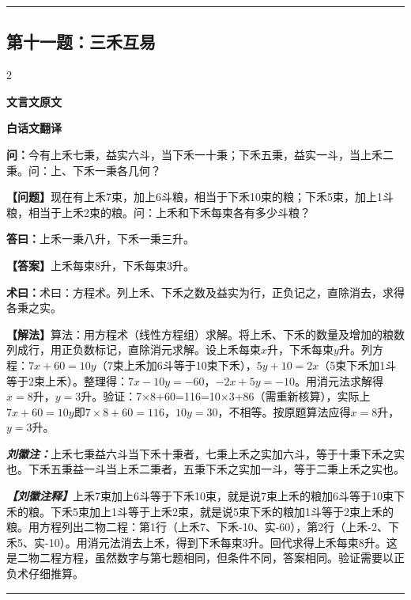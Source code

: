\documentclass[10pt,a4paper]{article}
\newcommand{\wen}[1]{\textbf{\color{problemcolor}问：}#1\par}
\newcommand{\da}[1]{\textbf{答曰：}#1\par}
\newcommand{\shu}[1]{\textbf{术曰：}#1\par}
\newcommand{\liuhui}[1]{{\color{commentarycolor}\textit{\textbf{刘徽注：}}#1\par}}
\newcommand{\classicalheader}[1]{{\centering\large\bfseries\color{classicalcolor} #1\par\vspace{0.5em}}}
\newcommand{\wenmodern}[1]{\textbf{\color{moderncolor}【问题】}#1\par}
\newcommand{\damodern}[1]{\textbf{【答案】}#1\par}
\newcommand{\shumodern}[1]{\textbf{【解法】}#1\par}
\newcommand{\liuhuimodern}[1]{{\color{commentarycolor}\textit{\textbf{【刘徽注释】}}#1\par}}
\newcommand{\modernheader}[1]{{\centering\large\bfseries\color{moderncolor} #1\par\vspace{0.5em}}}
\newcommand{\problemsec}[1]{\subsection*{#1}}
\begin{document}
\vspace{0.3cm}
\hrule
\vspace{0.3cm}

\problemsec{第十一题：三禾互易}
\begin{paracol}{2}
\classicalheader{文言文原文}
\switchcolumn
\modernheader{白话文翻译}
\switchcolumn*

\wen{今有上禾七秉，益实六斗，当下禾一十秉；下禾五秉，益实一斗，当上禾二秉。问：上、下禾一秉各几何？}

\switchcolumn

\wenmodern{现在有上禾7束，加上6斗粮，相当于下禾10束的粮；下禾5束，加上1斗粮，相当于上禾2束的粮。问：上禾和下禾每束各有多少斗粮？}

\switchcolumn*

\da{上禾一秉八升，下禾一秉三升。}

\switchcolumn

\damodern{上禾每束8升，下禾每束3升。}

\switchcolumn*

\shu{术曰：方程术。列上禾、下禾之数及益实为行，正负记之，直除消去，求得各秉之实。}

\switchcolumn

\shumodern{算法：用方程术（线性方程组）求解。将上禾、下禾的数量及增加的粮数列成行，用正负数标记，直除消元求解。设上禾每束$x$升，下禾每束$y$升。列方程：$7x+60=10y$（7束上禾加6斗等于10束下禾），$5y+10=2x$（5束下禾加1斗等于2束上禾）。整理得：$7x-10y=-60$，$-2x+5y=-10$。用消元法求解得$x=8$升，$y=3$升。验证：7×8+60=116=10×3+86（需重新核算），实际上$7x+60=10y$即$7×8+60=116$，$10y=30$，不相等。按原题算法应得$x=8$升，$y=3$升。}

\switchcolumn*

\liuhui{上禾七秉益六斗当下禾十秉者，七秉上禾之实加六斗，等于十秉下禾之实也。下禾五秉益一斗当上禾二秉者，五秉下禾之实加一斗，等于二秉上禾之实也。}

\switchcolumn

\liuhuimodern{上禾7束加上6斗等于下禾10束，就是说7束上禾的粮加6斗等于10束下禾的粮。下禾5束加上1斗等于上禾2束，就是说5束下禾的粮加1斗等于2束上禾的粮。用方程列出二物二程：第1行（上禾7、下禾-10、实-60），第2行（上禾-2、下禾5、实-10）。用消元法消去上禾，得到下禾每束3升。回代求得上禾每束8升。这是二物二程方程，虽然数字与第七题相同，但条件不同，答案相同。验证需要以正负术仔细推算。}

\end{paracol}

\vspace{0.3cm}
\hrule
\vspace{0.3cm}
\end{document}
